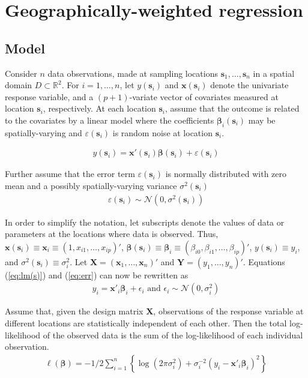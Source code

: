 \documentclass[authoryear, review, 11pt]{elsarticle}
\begin{document}
\section{Geographically-weighted regression \label{section:GWR}}

	\subsection{Model}
	Consider $n$ data observations, made at sampling locations $\bm{s}_1, \dots, \bm{s}_n$ in a spatial domain $D \subset \mathbb{R}^2$. For $i = 1, \dots, n$, let $y(\bm{s}_i)$ and $\bm{x}(\bm{s}_i)$ denote the univariate response variable, and a $(p+1)$-variate vector of covariates measured at location $\bm{s}_i$, respectively. At each location $\bm{s}_i$, assume that the outcome is related to the covariates by a linear model where the coefficients $\bm{\beta}_i(\bm{s}_i)$ may be spatially-varying and $\varepsilon(\bm{s}_i)$ is random noise at location $\bm{s}_i$.

	\begin{eqnarray}
		y(\bm{s}_i) = \bm{x}'(\bm{s}_i) \bm{\beta}(\bm{s}_i) + \varepsilon(\bm{s}_i)
	\label{eq:lm(s)}
	\end{eqnarray}
	
	Further assume that the error term $\varepsilon(\bm{s}_i)$ is normally distributed with zero mean and a possibly spatially-varying variance $\sigma^2(\bm{s}_i)$
	\begin{eqnarray}
		\varepsilon(\bm{s}_i) \sim \mathcal{N} \left( 0,\sigma^2(\bm{s}_i) \right)
	\label{eq:err}
	\end{eqnarray}
	
	In order to simplify the notation, let subscripts denote the values of data or parameters at the locations where data is observed. Thus, $\bm{x}(\bm{s}_i) \equiv \bm{x}_i \equiv \left( 1, x_{i1}, \dots, x_{ip} \right)'$, $\bm{\beta}(\bm{s}_i) \equiv \bm{\beta}_i \equiv \left(\beta_{i0}, \beta_{i1}, \dots, \beta_{ip} \right)'$, $y(\bm{s}_i) \equiv y_i$, and $\sigma^2(\bm{s}_i) \equiv \sigma^2_i$. Let $\bm{X} = \left( \bm{x}_1, \dots, \bm{x}_n \right)'$ and $\bm{Y} = \left( y_1, \dots, y_n \right)'$. Equations (\ref{eq:lm(s)}) and (\ref{eq:err}) can now be rewritten as
	\begin{eqnarray}
		y_i = \bm{x}'_i \bm{\beta}_i + \epsilon_i \text{ and } \epsilon_i \sim \mathcal{N} \left( 0,\sigma_i^2 \right)
	\end{eqnarray}
	
	Assume that, given the design matrix $\bm{X}$, observations of the response variable at different locations are statistically independent of each other. Then the total log-likelihood of the observed data is the sum of the log-likelihood of each individual observation.
	 \begin{eqnarray}
	 	\ell\left( \bm{\beta} \right) = - 1/2 \sum_{i=1}^n \left\{  \log \left( 2 \pi \sigma^2_i\right) +  \sigma^{-2}_i  \left(y_i - \bm{x}'_i\bm{\beta}_i \right)^2  \right\}
	\end{eqnarray}
	
\end{document}
